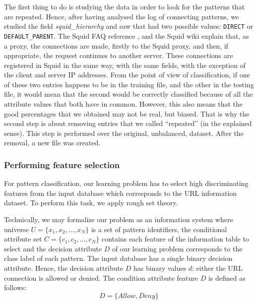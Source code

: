 \documentclass{llncs}
\begin{document}
The first thing to do is studying the data in order to look for the patterns that are repeated. Hence, after having analysed the log of connecting patterns, we studied the field \textit{squid\_hierarchy} and saw that had two possible values: \texttt{DIRECT} or \texttt{DEFAULT\_PARENT}. The Squid FAQ reference \cite{squid_logs}, and the Squid wiki \cite{squid_wiki} explain that, as a proxy, the connections are made, firstly to the Squid proxy, and then, if appropriate, the request continues to another server. These connections are registered in Squid in the same way, with the same fields, with the exception of the client and server IP addresses. From the point of view of classification, if one of these two entries happens to be in the training file, and the other in the testing file, it would mean that the second would be correctly classified because of all the attribute values that both have in common. However, this also means that the good percentages that we obtained may not be real, but biased. That is why the second step is about removing entries that we called ``repeated'' (in the explained sense). This step is performed over the original, unbalanced, dataset. After the removal, a new file was created.

%
\subsubsection{Performing feature selection}
\label{subsec:featselresults}

For pattern classification, our learning problem has to select high discriminating features from the input database which corresponds to the URL information dataset. To perform this task, we apply rough set theory. 

Technically, we may formalize our problem as an information system where universe $U = \{x_1, x_2, \ldots, x_N\}$ is a set of pattern identifiers, the conditional attribute set $C =\{c_1,c_2, \ldots, c_N\}$ contains each feature of the information table to select and the decision attribute $D$ of our learning problem corresponds to the class label of each pattern. The input database has a single binary decision attribute. Hence, the decision attribute $D$  has binary values $d$:  either the URL connection is allowed   or denied. The condition attribute feature $D$ is defined as follows:
\begin{displaymath}
D =\{Allow, Deny\}
\end{displaymath}
\end{document}
